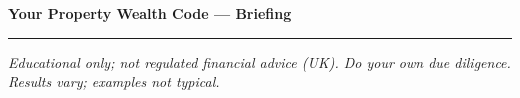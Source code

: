 \documentclass[a4paper,11pt]{article}
\begin{document}
{\Large \textbf{Your Property Wealth Code — Briefing}}\\[1mm]



\smallskip\hrule\smallskip
\footnotesize \textit{Educational only; not regulated financial advice (UK). Do your own due diligence. Results vary; examples not typical.}
\end{document}
